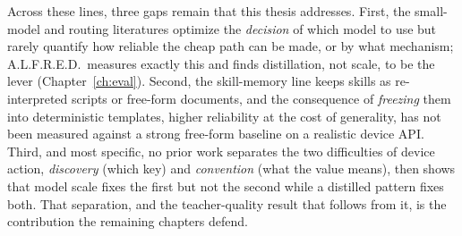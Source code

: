 Across these lines, three gaps remain that this thesis addresses. First, the
small-model and routing literatures optimize the \emph{decision} of which model to
use but rarely quantify how reliable the cheap path can be made, or by what
mechanism; A.L.F.R.E.D.\ measures exactly this and finds distillation, not scale,
to be the lever (Chapter~\ref{ch:eval}). Second, the skill-memory line keeps
skills as re-interpreted scripts or free-form documents, and the consequence of
\emph{freezing} them into deterministic templates, higher reliability at the cost
of generality, has not been measured against a strong free-form baseline on a
realistic device API. Third, and most specific, no prior work separates the two
difficulties of device action, \emph{discovery} (which key) and \emph{convention}
(what the value means), then shows that model scale fixes the first but not the
second while a distilled pattern fixes both. That separation, and the
teacher-quality result that follows from it, is the contribution the remaining
chapters defend.
